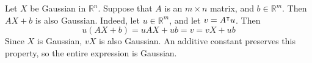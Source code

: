 \documentclass{article}
\begin{document}
Let $X$ be Gaussian in $\mathbb R^n$. Suppose that $A$ is an $m \times n$ matrix, and $b \in \mathbb R^m$. Then $AX + b$ is also Gaussian. Indeed, let $u \in \mathbb R^m$, and let $v = A^\intercal u$. Then
\[ u(AX + b) = uAX + ub = v = vX + ub \]
Since $X$ is Gaussian, $vX$ is also Gaussian. An additive constant preserves this property, so the entire expression is Gaussian.
\end{document}
